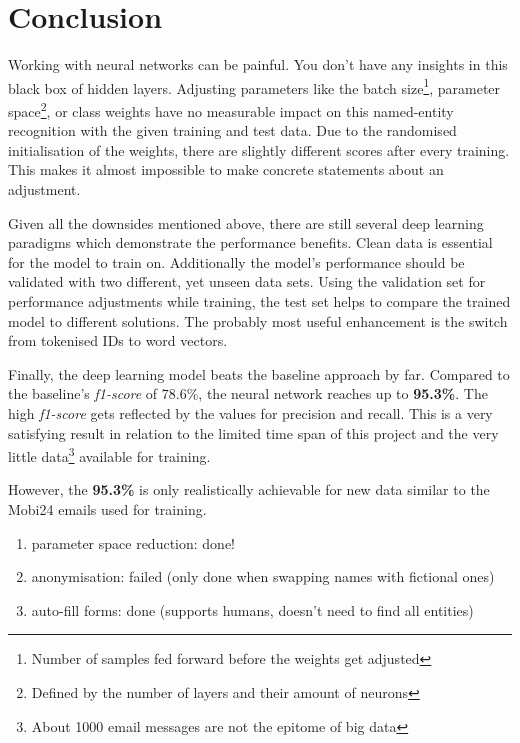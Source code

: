\section{Conclusion}

Working with neural networks can be painful. You don't have any insights in this black box of hidden layers. Adjusting parameters like the batch size\footnote{Number of samples fed forward before the weights get adjusted}, parameter space\footnote{Defined by the number of layers and their amount of neurons}, or class weights have no measurable impact on this named-entity recognition with the given training and test data. Due to the randomised initialisation of the weights, there are slightly different scores after every training. This makes it almost impossible to make concrete statements about an adjustment.

Given all the downsides mentioned above, there are still several deep learning paradigms which demonstrate the performance benefits. Clean data is essential for the model to train on. Additionally the model's performance should be validated with two different, yet unseen data sets. Using the validation set for performance adjustments while training, the test set helps to compare the trained model to different solutions. The probably most useful enhancement is the switch from tokenised IDs to word vectors.

Finally, the deep learning model beats the baseline approach by far. Compared to the baseline's \emph{f1-score} of 78.6\%, the neural network reaches up to \textbf{95.3\%}. The high \emph{f1-score} gets reflected by the values for precision and recall. This is a very satisfying result in relation to the limited time span of this project and the very little data\footnote{About 1000 email messages are not the epitome of big data} available for training.

However, the \textbf{95.3\%} is only realistically achievable for new data similar to the Mobi24 emails used for training. 
\begin{enumerate}
    \item parameter space reduction: done!
    \item anonymisation: failed (only done when swapping names with fictional ones)
    \item auto-fill forms: done (supports humans, doesn't need to find all entities)
\end{enumerate}
